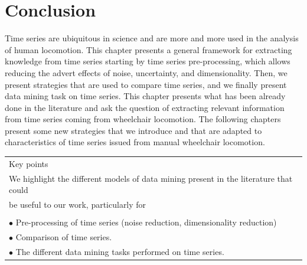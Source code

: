 \section{Conclusion}
Time series are ubiquitous in science and are more and more used in the analysis of human locomotion. This chapter presents a general framework for extracting knowledge from time series starting by time series pre-processing, which allows reducing the advert effects of noise, uncertainty, and dimensionality. Then, we present strategies that are used to compare time series, and we finally present data mining task on time series. This chapter presents what has been already done in the literature and ask the question of extracting relevant information from time series coming from wheelchair locomotion. The following chapters present some new strategies that we introduce and that are adapted to characteristics of time series issued from manual wheelchair locomotion.

\begin{table}[ht]
\centering
\begin{tabular}{|l|}

\hline
\rowcolor{LavenderBlush}
Key points\\
We highlight the different models of data mining present in the literature that could\\ be useful to our work, particularly for  \\
\\
$\bullet$ Pre-processing of time series (noise reduction, dimensionality reduction) \\
$\bullet$ Comparison of time series.\\ 
$\bullet$ The different data mining tasks performed on time series.\\
\hline
\end{tabular}
\end{table}